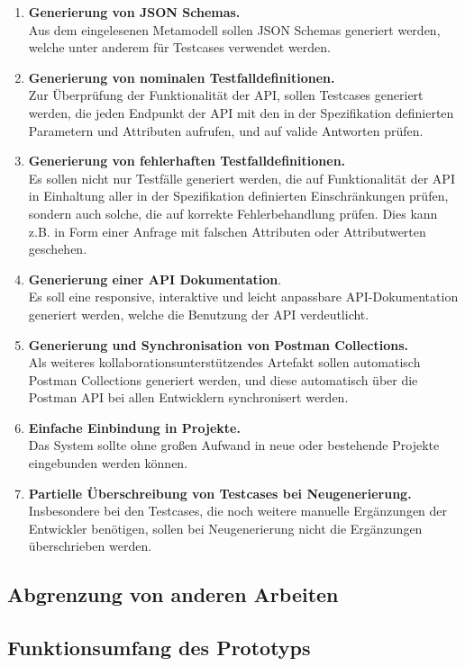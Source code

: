 \begin{enumerate}
	\item \textbf{Generierung von JSON Schemas.} \\
	Aus dem eingelesenen Metamodell sollen JSON Schemas generiert werden, welche unter anderem für Testcases verwendet werden.
	\item \textbf{Generierung von nominalen Testfalldefinitionen.} \\
	Zur Überprüfung der Funktionalität der API, sollen Testcases generiert werden, die jeden Endpunkt der API mit den in der Spezifikation definierten Parametern und Attributen aufrufen, und auf valide Antworten prüfen.
	\item \textbf{Generierung von fehlerhaften Testfalldefinitionen.} \\
	Es sollen nicht nur Testfälle generiert werden, die auf Funktionalität der API in Einhaltung aller in der Spezifikation definierten Einschränkungen prüfen, sondern auch solche, die auf korrekte Fehlerbehandlung prüfen. Dies kann z.B. in Form einer Anfrage mit falschen Attributen oder Attributwerten geschehen.
	\item \textbf{Generierung einer API Dokumentation}. \\
	Es soll eine responsive, interaktive und leicht anpassbare API-Dokumentation generiert werden, welche die Benutzung der API verdeutlicht.
	\item \textbf{Generierung und Synchronisation von Postman Collections.} \\
	Als weiteres kollaborationsunterstützendes Artefakt sollen automatisch Postman Collections generiert werden, und diese automatisch über die Postman API bei allen Entwicklern synchronisert werden.
	\item \textbf{Einfache Einbindung in Projekte.} \\
	Das System sollte ohne großen Aufwand in neue oder bestehende Projekte eingebunden werden können.  
	\item \textbf{Partielle Überschreibung von Testcases bei Neugenerierung. } \\
	Insbesondere bei den Testcases, die noch weitere manuelle Ergänzungen der Entwickler benötigen, sollen bei Neugenerierung nicht die Ergänzungen überschrieben werden.
\end{enumerate}


\subsection{Abgrenzung von anderen Arbeiten}

\subsection{Funktionsumfang des Prototyps}
